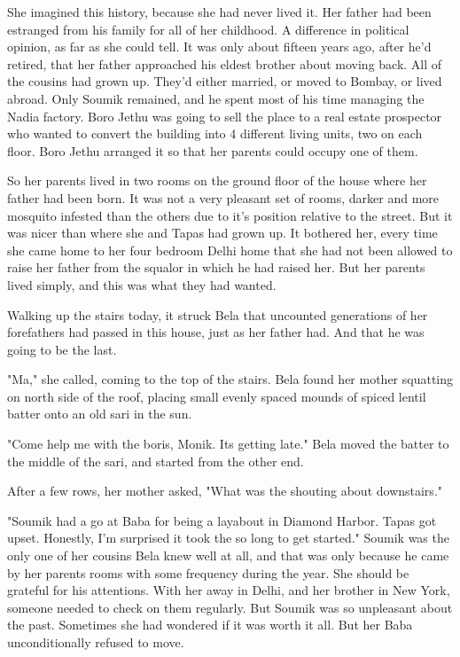 \documentclass{amsart}
\begin{document}
She imagined this history, because she had never lived it. Her father had been estranged from his family for all of her childhood. A difference in political opinion, as far as she could tell. It was only about fifteen years ago, after he'd retired, that her father approached his eldest brother about moving back. All of the cousins had grown up. They'd either married, or moved to Bombay, or lived abroad. Only Soumik remained, and he spent most of his time managing the Nadia factory. Boro Jethu was going to sell the place to a real estate prospector who wanted to convert the building into 4 different living units, two on each floor. Boro Jethu arranged it so that her parents could occupy one of them. 

So her parents lived in two rooms on the ground floor of the house where her father had been born. It was not a very pleasant set of rooms, darker and more mosquito infested than the others due to it's position relative to the street. But it was nicer than where she and Tapas had grown up. It bothered her, every time she came home to her four bedroom Delhi home that she had not been allowed to raise her father from the squalor in which he had raised her. But her parents lived simply, and this was what they had wanted. 

Walking up the stairs today, it struck Bela that uncounted generations of her forefathers had passed in this house, just as her father had. And that he was going to be the last.

"Ma," she called, coming to the top of the stairs. Bela found her mother squatting on north side of the roof, placing small evenly spaced mounds of spiced lentil batter onto an old sari in the sun. 

"Come help me with the boris, Monik. Its getting late." Bela moved the batter to the middle of the sari, and started from the other end.

After a few rows, her mother asked, "What was the shouting about downstairs."

"Soumik had a go at Baba for being a layabout in Diamond Harbor. Tapas got upset. Honestly, I'm surprised it took the so long to get started." Soumik was the only one of her cousins Bela knew well at all, and that was only because he came by her parents rooms with some frequency during the year. She should be grateful for his attentions. With her away in Delhi, and her brother in New York, someone needed to check on them regularly. But Soumik was so unpleasant about the past. Sometimes she had wondered if it was worth it all. But her Baba unconditionally refused to move. 
\end{document}
